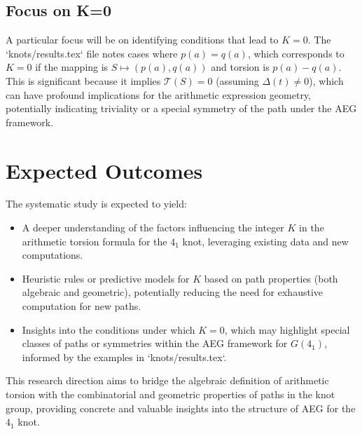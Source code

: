 \documentclass{article}
\begin{document}
\subsection{Focus on K=0}
A particular focus will be on identifying conditions that lead to $K=0$. The `knots/results.tex` file notes cases where $p(a)=q(a)$, which corresponds to $K=0$ if the mapping is $S \mapsto (p(a), q(a))$ and torsion is $p(a)-q(a)$. This is significant because it implies $\mathcal{T}(S) = 0$ (assuming $\Delta(t) \neq 0$), which can have profound implications for the arithmetic expression geometry, potentially indicating triviality or a special symmetry of the path under the AEG framework.

\section{Expected Outcomes}
The systematic study is expected to yield:
\begin{itemize}
    \item A deeper understanding of the factors influencing the integer $K$ in the arithmetic torsion formula for the $4_1$ knot, leveraging existing data and new computations.
    \item Heuristic rules or predictive models for $K$ based on path properties (both algebraic and geometric), potentially reducing the need for exhaustive computation for new paths.
    \item Insights into the conditions under which $K=0$, which may highlight special classes of paths or symmetries within the AEG framework for $G(4_1)$, informed by the examples in `knots/results.tex`.
\end{itemize}

This research direction aims to bridge the algebraic definition of arithmetic torsion with the combinatorial and geometric properties of paths in the knot group, providing concrete and valuable insights into the structure of AEG for the $4_1$ knot.
\end{document}
